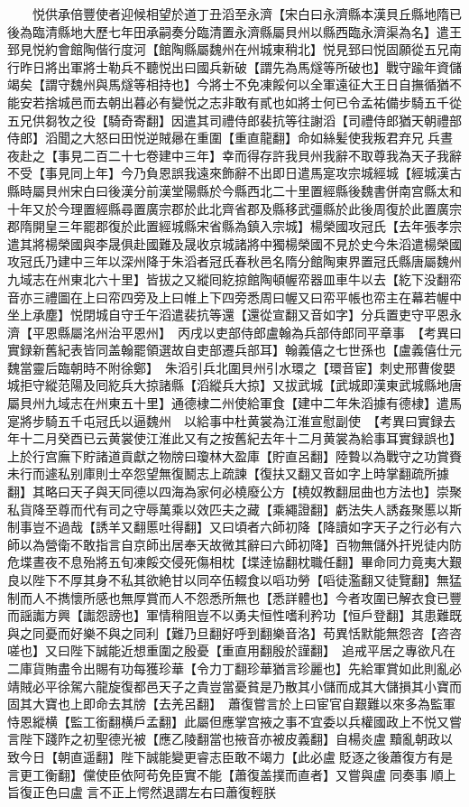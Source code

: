 　　悦供承倍豐使者迎候相望於道丁丑滔至永濟【宋白曰永濟縣本漢貝丘縣地隋已後為臨清縣地大歷七年田承嗣奏分臨清置永濟縣屬貝州以縣西臨永濟渠為名】遣王郅見悦約會館陶偕行度河【館陶縣屬魏州在州城東稍北】悦見郅曰悦固願從五兄南行昨日將出軍將士勒兵不聽悦出曰國兵新破【謂先為馬燧等所破也】戰守踰年資儲竭矣【謂守魏州與馬燧等相持也】今將士不免凍餒何以全軍遠征大王日自撫循猶不能安若捨城邑而去朝出暮必有變悦之志非敢有貳也如將士何已令孟祐備步騎五千從五兄供芻牧之役【騎奇寄翻】因遣其司禮侍郎裴抗等往謝滔【司禮侍郎猶天朝禮部侍郎】滔聞之大怒曰田悦逆賊曏在重圍【重直龍翻】命如絲髪使我叛君弃兄兵晝夜赴之【事見二百二十七卷建中三年】幸而得存許我貝州我辭不取尊我為天子我辭不受【事見同上年】今乃負恩誤我遠來飾辭不出即日遣馬寔攻宗城經城【經城漢古縣時屬貝州宋白曰後漢分前漢堂陽縣於今縣西北二十里置經縣後魏書併南宫縣太和十年又於今理置經縣尋置廣宗郡於此北齊省郡及縣移武彊縣於此後周復於此置廣宗郡隋開皇三年罷郡復於此置經城縣宋省縣為鎮入宗城】楊榮國攻冠氏【去年張孝宗遣其將楊榮國與李晟俱赴國難及晟收京城諸將中獨楊榮國不見於史今朱滔遣楊榮國攻冠氏乃建中三年以深州降于朱滔者冠氏春秋邑名隋分館陶東界置冠氏縣唐屬魏州九域志在州東北六十里】皆拔之又縱囘紇掠館陶頓幄帟器皿車牛以去【紇下没翻帟音亦三禮圖在上曰帟四旁及上曰帷上下四旁悉周曰幄又曰帟平帳也帟主在幕若幄中坐上承塵】悦閉城自守壬午滔遣裴抗等還【還從宣翻又音如字】分兵置吏守平恩永濟【平恩縣屬洺州治平恩州】　丙戌以吏部侍郎盧翰為兵部侍郎同平章事　【考異曰實録新舊紀表皆同盖翰罷領選故自吏部遷兵部耳】翰義僖之七世孫也【盧義僖仕元魏當靈后臨朝時不附徐鄭】　朱滔引兵北圍貝州引水環之【環音宦】刺史邢曹俊嬰城拒守縱范陽及囘紇兵大掠諸縣【滔縱兵大掠】又拔武城【武城即漢東武城縣地唐屬貝州九域志在州東五十里】通德棣二州使給軍食【建中二年朱滔據有德棣】遣馬寔將步騎五千屯冠氏以逼魏州　以給事中杜黄裳為江淮宣慰副使　【考異曰實録去年十二月癸酉已云黄裳使江淮此又有之按舊紀去年十二月黄裳為給事耳實録誤也】　上於行宫廡下貯諸道貢獻之物牓曰瓊林大盈庫【貯直呂翻】陸䞇以為戰守之功賞賚未行而遽私别庫則士卒怨望無復鬭志上疏諫【復扶又翻又音如字上時掌翻疏所據翻】其略曰天子與天同德以四海為家何必橈廢公方【橈奴教翻屈曲也方法也】崇聚私貨降至尊而代有司之守辱萬乘以效匹夫之藏【乘繩證翻】虧法失人誘姦聚慝以斯制事豈不過哉【誘羊又翻慝吐得翻】又曰頃者六師初降【降讀如字天子之行必有六師以為營衛不敢指言自京師出居奉天故微其辭曰六師初降】百物無儲外扞兇徒内防危堞晝夜不息殆將五旬凍餒交侵死傷相枕【堞逹協翻枕職任翻】畢命同力竟夷大艱良以陛下不厚其身不私其欲絶甘以同卒伍輟食以㗖功勞【㗖徒濫翻又徒覽翻】無猛制而人不擕懷所感也無厚賞而人不怨悉所無也【悉詳體也】今者攻圍已解衣食已豐而謡讟方興【讟怨謗也】軍情稍阻豈不以勇夫恒性嗜利矜功【恒戶登翻】其患難既與之同憂而好樂不與之同利【難乃旦翻好呼到翻樂音洛】苟異恬默能無怨咨【咨咨嗟也】又曰陛下誠能近想重圍之殷憂【重直用翻殷於謹翻】　追戒平居之專欲凡在二庫貨賄盡令出賜有功每獲珍華【令力丁翻珍華猶言珍麗也】先給軍賞如此則亂必靖賊必平徐駕六龍旋復都邑天子之貴豈當憂貧是乃散其小儲而成其大儲損其小寶而固其大寶也上即命去其牓【去羌呂翻】　蕭復嘗言於上曰宦官自艱難以來多為監軍恃恩縱横【監工銜翻横戶孟翻】此屬但應掌宫掖之事不宜委以兵權國政上不悦又嘗言陛下踐阼之初聖德光被【應乙陵翻當也掖音亦被皮義翻】自楊炎盧黷亂朝政以致今日【朝直遥翻】陛下誠能變更睿志臣敢不竭力【此必盧貶逐之後蕭復方有是言更工衡翻】儻使臣依阿苟免臣實不能【蕭復盖撲而直者】又嘗與盧同奏事順上旨復正色曰盧言不正上愕然退謂左右曰蕭復輕朕